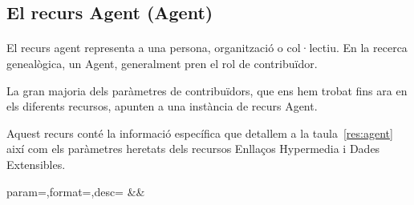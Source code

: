 \subsection{El recurs Agent (Agent)}

    \paragraph{}
    El recurs agent representa a una persona, organització o col·lectiu. En la recerca genealògica, un Agent, generalment pren el rol de contribuïdor.

    La gran majoria dels paràmetres de contribuïdors, que ens hem trobat fins ara en els diferents recursos, apunten a una instància de recurs Agent.

    Aquest recurs conté la informació específica que detallem a la taula~\ref{res:agent} així com els paràmetres heretats dels recursos Enllaços Hypermedia i Dades Extensibles.

    \begin{center}
             {param=\param,format=\format,desc=\desc}
             {\param&\format&\desc}
     \end{center}
